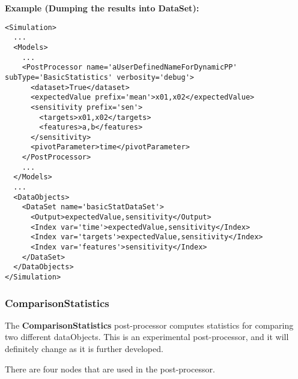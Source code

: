 \textbf{Example (Dumping the results into DataSet):}
\begin{lstlisting}[style=XML,morekeywords={name,subType,debug}]
<Simulation>
  ...
  <Models>
    ...
    <PostProcessor name='aUserDefinedNameForDynamicPP' subType='BasicStatistics' verbosity='debug'>
      <dataset>True</dataset>
      <expectedValue prefix='mean'>x01,x02</expectedValue>
      <sensitivity prefix='sen'>
        <targets>x01,x02</targets>
        <features>a,b</features>
      </sensitivity>
      <pivotParameter>time</pivotParameter>
    </PostProcessor>
    ...
  </Models>
  ...
  <DataObjects>
    <DataSet name='basicStatDataSet'>
      <Output>expectedValue,sensitivity</Output>
      <Index var='time'>expectedValue,sensitivity</Index>
      <Index var='targets'>expectedValue,sensitivity</Index>
      <Index var='features'>sensitivity</Index>
    </DataSet>
  </DataObjects>
</Simulation>
\end{lstlisting}
\subsubsection{ComparisonStatistics}
\label{ComparisonStatistics}
The \textbf{ComparisonStatistics} post-processor computes statistics
for comparing two different dataObjects.  This is an experimental
post-processor, and it will definitely change as it is further
developed.

There are four nodes that are used in the post-processor.

